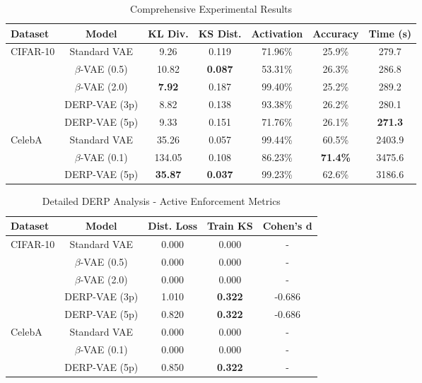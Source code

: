 \documentclass[11pt]{article}
\begin{document}
\begin{table}[ht]
\centering
\caption{Comprehensive Experimental Results}
\label{tab:comprehensive_results}
\begin{tabular}{@{}lcccccc@{}}
\toprule
\textbf{Dataset} & \textbf{Model} & \textbf{KL Div.} & \textbf{KS Dist.} & \textbf{Activation} & \textbf{Accuracy} & \textbf{Time (s)} \\
\midrule
\multirow{5}{*}{CIFAR-10} & Standard VAE & 9.26 & 0.119 & 71.96\% & 25.9\% & 279.7 \\
& $\beta$-VAE (0.5) & 10.82 & \textbf{0.087} & 53.31\% & 26.3\% & 286.8 \\
& $\beta$-VAE (2.0) & \textbf{7.92} & 0.187 & 99.40\% & 25.2\% & 289.2 \\
& DERP-VAE (3p) & 8.82 & 0.138 & 93.38\% & 26.2\% & 280.1 \\
& DERP-VAE (5p) & 9.33 & 0.151 & 71.76\% & 26.1\% & \textbf{271.3} \\
\midrule
\multirow{3}{*}{CelebA} & Standard VAE & 35.26 & 0.057 & 99.44\% & 60.5\% & 2403.9 \\
& $\beta$-VAE (0.1) & 134.05 & 0.108 & 86.23\% & \textbf{71.4\%} & 3475.6 \\
& DERP-VAE (5p) & \textbf{35.87} & \textbf{0.037} & 99.23\% & 62.6\% & 3186.6 \\
\bottomrule
\end{tabular}
\end{table}

\begin{table}[ht]
\centering
\caption{Detailed DERP Analysis - Active Enforcement Metrics}
\label{tab:detailed_analysis}
\begin{tabular}{@{}lcccc@{}}
\toprule
\textbf{Dataset} & \textbf{Model} & \textbf{Dist. Loss} & \textbf{Train KS} & \textbf{Cohen's d} \\
\midrule
\multirow{5}{*}{CIFAR-10} & Standard VAE & 0.000 & 0.000 & - \\
& $\beta$-VAE (0.5) & 0.000 & 0.000 & - \\
& $\beta$-VAE (2.0) & 0.000 & 0.000 & - \\
& DERP-VAE (3p) & 1.010 & \textbf{0.322} & -0.686 \\
& DERP-VAE (5p) & 0.820 & \textbf{0.322} & -0.686 \\
\midrule
\multirow{3}{*}{CelebA} & Standard VAE & 0.000 & 0.000 & - \\
& $\beta$-VAE (0.1) & 0.000 & 0.000 & - \\
& DERP-VAE (5p) & 0.850 & \textbf{0.322} & - \\
\bottomrule
\end{tabular}
\end{table}
\end{document}
